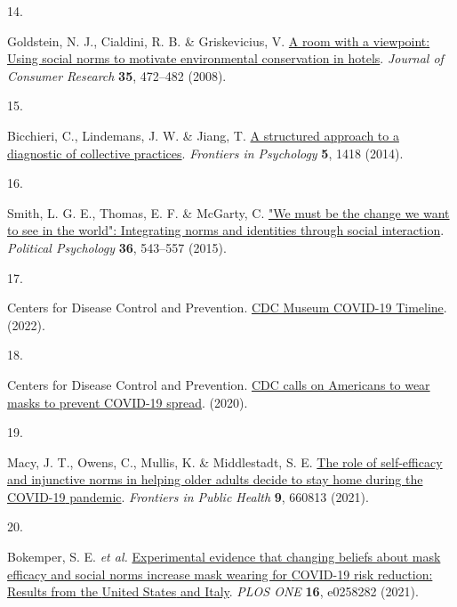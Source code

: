 \documentclass[
  man, donotrepeattitle,floatsintext]{apa6}
\newlength{\cslhangindent}
\newlength{\csllabelwidth}
\newlength{\cslentryspacingunit} %
\newenvironment{CSLReferences}[2] %
 {%
  \setlength{\parindent}{0pt}
  \ifodd #1
  \let\oldpar\par
  \def\par{\hangindent=\cslhangindent\oldpar}
  \fi
  \setlength{\parskip}{#2\cslentryspacingunit}
 }%
 {}
\newcommand{\CSLLeftMargin}[1]{\parbox[t]{\csllabelwidth}{#1}}
\newcommand{\CSLRightInline}[1]{\parbox[t]{\linewidth - \csllabelwidth}{#1}\break}
\begin{document}
\begin{CSLReferences}{0}{0}
\leavevmode{}%
\CSLLeftMargin{14. }%
\CSLRightInline{Goldstein, N. J., Cialdini, R. B. \& Griskevicius, V. \href{https://doi.org/10.1086/586910}{A room with a viewpoint: Using social norms to motivate environmental conservation in hotels}. \emph{Journal of Consumer Research} \textbf{35}, 472--482 (2008).}

\leavevmode{}%
\CSLLeftMargin{15. }%
\CSLRightInline{Bicchieri, C., Lindemans, J. W. \& Jiang, T. \href{https://doi.org/10.3389/fpsyg.2014.01418}{A structured approach to a diagnostic of collective practices}. \emph{Frontiers in Psychology} \textbf{5}, 1418 (2014).}

\leavevmode{}%
\CSLLeftMargin{16. }%
\CSLRightInline{Smith, L. G. E., Thomas, E. F. \& McGarty, C. \href{https://doi.org/10.1111/pops.12180}{"We must be the change we want to see in the world": Integrating norms and identities through social interaction}. \emph{Political Psychology} \textbf{36}, 543--557 (2015).}

\leavevmode{}%
\CSLLeftMargin{17. }%
\CSLRightInline{Centers for Disease Control and Prevention. \href{https://www.cdc.gov/museum/timeline/covid19.html}{{CDC Museum COVID-19 Timeline}}. (2022).}

\leavevmode{}%
\CSLLeftMargin{18. }%
\CSLRightInline{Centers for Disease Control and Prevention. \href{https://www.cdc.gov/media/releases/2020/p0714-americans-to-wear-masks.html}{{CDC calls on Americans to wear masks to prevent COVID-19 spread}}. (2020).}

\leavevmode{}%
\CSLLeftMargin{19. }%
\CSLRightInline{Macy, J. T., Owens, C., Mullis, K. \& Middlestadt, S. E. \href{https://doi.org/10.3389/fpubh.2021.660813}{The role of self-efficacy and injunctive norms in helping older adults decide to stay home during the {COVID-19} pandemic}. \emph{Frontiers in Public Health} \textbf{9}, 660813 (2021).}

\leavevmode{}%
\CSLLeftMargin{20. }%
\CSLRightInline{Bokemper, S. E. \emph{et al.} \href{https://doi.org/10.1371/journal.pone.0258282}{Experimental evidence that changing beliefs about mask efficacy and social norms increase mask wearing for {COVID-19} risk reduction: Results from the {United States} and {Italy}}. \emph{PLOS ONE} \textbf{16}, e0258282 (2021).}


\end{CSLReferences}
\end{document}
